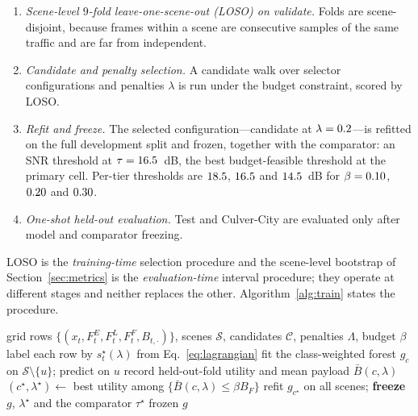 \documentclass[journal]{IEEEtran}
\begin{document}
\begin{enumerate}
\item \emph{Scene-level $9$-fold leave-one-scene-out (LOSO) on validate.} Folds are scene-disjoint,
because frames within a scene are consecutive samples of the same traffic and are far from
independent.
\item \emph{Candidate and penalty selection.} A candidate walk over selector configurations and
penalties $\lambda$ is run under the budget constraint, scored by LOSO.
\item \emph{Refit and freeze.} The selected configuration---candidate \CandIdx{} at
$\lambda = 0.2$---is refitted on the full development split and frozen, together with the
comparator: an SNR threshold at $\tau = 16.5$~dB, the best budget-feasible threshold at the
primary cell. Per-tier thresholds are $18.5$, $16.5$ and $14.5$~dB for
$\beta = 0.10$, $0.20$ and $0.30$.
\item \emph{One-shot held-out evaluation.} Test and Culver-City are evaluated only after model
and comparator freezing.
\end{enumerate}

LOSO is the \emph{training-time} selection procedure and the scene-level bootstrap of
Section~\ref{sec:metrics} is the \emph{evaluation-time} interval procedure; they operate at different
stages and neither replaces the other. Algorithm~\ref{alg:train} states the procedure.

\begin{algorithm}[t]
\caption{Selector selection and freezing (development split)}
\label{alg:train}
\begin{algorithmic}[1]
\Require grid rows $\{(x_t, F_t^{E}, F_t^{L}, F_t^{F}, B_{t,\cdot})\}$, scenes $\mathcal{S}$,
  candidates $\mathcal{C}$, penalties $\Lambda$, budget $\beta$
  \State label each row by $s_t^{\star}(\lambda)$ from Eq.~\eqref{eq:lagrangian}
    \State fit the class-weighted forest $g_{c}$ on $\mathcal{S} \setminus \{u\}$; predict on $u$
  \EndFor
  \State record held-out-fold utility and mean payload $\bar B(c,\lambda)$
\EndFor
\State $(c^{\star}, \lambda^{\star}) \gets$ best utility among $\{\bar B(c,\lambda) \le \beta B_F\}$
\State refit $g_{c^{\star}}$ on all scenes; \textbf{freeze} $g$, $\lambda^{\star}$ and the
  comparator $\tau^{\star}$
\State \Return frozen $g$ 
\end{algorithmic}
\end{algorithm}
\end{document}
